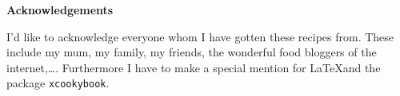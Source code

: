 \newenvironment{acknowledgements}%
    {\cleardoublepage\thispagestyle{empty}\null\vfill\begin{center}%
    \bfseries Acknowledgements\end{center}}%
    {\vfill\null}
        \begin{acknowledgements}
        I'd like to acknowledge everyone whom I have gotten these recipes from. These include my mum, my family, my friends, the wonderful food bloggers of the internet,\ldots. Furthermore I have to make a special mention for \LaTeX and the package \lstinline!xcookybook!.
        \end{acknowledgements}
